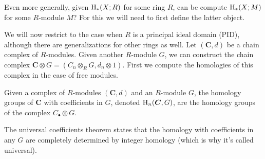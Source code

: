 Even more generally, given $\mathrm{H}_\ast(X;R)$ for some ring $R$, can be compute $\mathrm{H}_\ast(X;M)$ for some $R$-module $M$? For this we will need to first define the latter object.


We will now restrict to the case when $R$ is a principal ideal domain (PID), although there are generalizations for other rings as well. Let $(\bm{C},d)$ be a chain complex of $R$-modules.  Given another $R$-module $G$, we can construct the chain complex $\bm{C}\otimes G=(C_n\otimes_R G,d_n\otimes 1)$. First we compute the homologies of this complex in the case of free modules. 

\begin{defn}
    Given a complex of $R$-modules $(\bm{C},d)$ and an $R$-module $G$, the homology groups of $\bm{C}$ with coefficients in $G$, denoted $\mathrm{H}_n(\boldsymbol{C},G)$, are the homology groups of the complex $C_\bullet\otimes G$.
\end{defn}

The universal coefficients theorem states that the homology with coefficients in any $G$ are completely determined by integer homology (which is why it's called universal).

